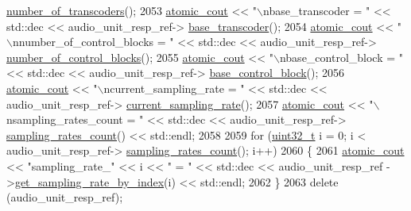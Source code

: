 \begin{DoxyCode}
      \hyperlink{classavdecc__lib_1_1audio__unit__descriptor__response_a55670f24cb0eef2234ebd0629e4fb503}{number\_of\_transcoders}();
2053             \hyperlink{cmd__line_8h_a0bc38ccc65c79ba06c6fcd7b4bf554c3}{atomic\_cout} << \textcolor{stringliteral}{"\(\backslash\)nbase\_transcoder = "} << std::dec << audio\_unit\_resp\_ref->
      \hyperlink{classavdecc__lib_1_1audio__unit__descriptor__response_aefa33c5c004be51707d39f570c7e7820}{base\_transcoder}();
2054             \hyperlink{cmd__line_8h_a0bc38ccc65c79ba06c6fcd7b4bf554c3}{atomic\_cout} << \textcolor{stringliteral}{"\(\backslash\)nnumber\_of\_control\_blocks = "} << std::dec << audio\_unit\_resp\_ref->
      \hyperlink{classavdecc__lib_1_1audio__unit__descriptor__response_a987663f7b6993b22248204c6d1f59f53}{number\_of\_control\_blocks}();
2055             \hyperlink{cmd__line_8h_a0bc38ccc65c79ba06c6fcd7b4bf554c3}{atomic\_cout} << \textcolor{stringliteral}{"\(\backslash\)nbase\_control\_block = "} << std::dec << audio\_unit\_resp\_ref->
      \hyperlink{classavdecc__lib_1_1audio__unit__descriptor__response_a81f9751499040fb0f03c1bccb916bc15}{base\_control\_block}();
2056             \hyperlink{cmd__line_8h_a0bc38ccc65c79ba06c6fcd7b4bf554c3}{atomic\_cout} << \textcolor{stringliteral}{"\(\backslash\)ncurrent\_sampling\_rate = "} << std::dec << audio\_unit\_resp\_ref->
      \hyperlink{classavdecc__lib_1_1audio__unit__descriptor__response_a115c8f2c1f0bd18abff75088d1932b02}{current\_sampling\_rate}();
2057             \hyperlink{cmd__line_8h_a0bc38ccc65c79ba06c6fcd7b4bf554c3}{atomic\_cout} << \textcolor{stringliteral}{"\(\backslash\)nsampling\_rates\_count = "} << std::dec << audio\_unit\_resp\_ref->
      \hyperlink{classavdecc__lib_1_1audio__unit__descriptor__response_a07f5bff31c9d15bb4a2e300ddb5be5b7}{sampling\_rates\_count}() << std::endl;
2058 
2059             \textcolor{keywordflow}{for} (\hyperlink{parse_8c_a6eb1e68cc391dd753bc8ce896dbb8315}{uint32\_t} i = 0; i < audio\_unit\_resp\_ref->
      \hyperlink{classavdecc__lib_1_1audio__unit__descriptor__response_a07f5bff31c9d15bb4a2e300ddb5be5b7}{sampling\_rates\_count}(); i++)
2060             \{
2061                 \hyperlink{cmd__line_8h_a0bc38ccc65c79ba06c6fcd7b4bf554c3}{atomic\_cout} << \textcolor{stringliteral}{"sampling\_rate\_"} << i << \textcolor{stringliteral}{" = "} << std::dec << audio\_unit\_resp\_ref
      ->\hyperlink{classavdecc__lib_1_1audio__unit__descriptor__response_afc7a1bf085d4a33f345bed082efd0737}{get\_sampling\_rate\_by\_index}(i) << std::endl;
2062             \}
2063             \textcolor{keyword}{delete} (audio\_unit\_resp\_ref);

\end{DoxyCode}
